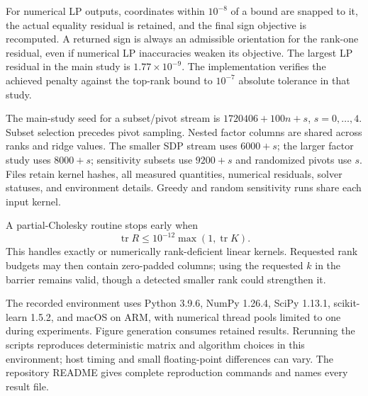 \documentclass[final,leqno,letterpaper]{etna}
\newcommand{\tr}{\operatorname{tr}}
\begin{document}
For numerical LP outputs, coordinates within $10^{-8}$ of a bound are snapped to it, the actual equality residual is retained, and the final sign objective is recomputed. A returned sign is always an admissible orientation for the rank-one residual, even if numerical LP inaccuracies weaken its objective. The largest LP residual in the main study is $1.77\times10^{-9}$. The implementation verifies the achieved penalty against the top-rank bound to $10^{-7}$ absolute tolerance in that study.

The main-study seed for a subset/pivot stream is $1720406+100n+s$, $s=0,\ldots,4$. Subset selection precedes pivot sampling. Nested factor columns are shared across ranks and ridge values. The smaller SDP stream uses $6000+s$; the larger factor study uses $8000+s$; sensitivity subsets use $9200+s$ and randomized pivots use $s$. Files retain kernel hashes, all measured quantities, numerical residuals, solver statuses, and environment details. Greedy and random sensitivity runs share each input kernel.

A partial-Cholesky routine stops early when
\[\tr R\le 10^{-12}\max(1,\tr K).\] This handles exactly or numerically rank-deficient linear kernels. Requested rank budgets may then contain zero-padded columns; using the requested $k$ in the barrier remains valid, though a detected smaller rank could strengthen it.

The recorded environment uses Python 3.9.6, NumPy 1.26.4, SciPy 1.13.1, scikit-learn 1.5.2, and macOS on ARM, with numerical thread pools limited to one during experiments. Figure generation consumes retained results. Rerunning the scripts reproduces deterministic matrix and algorithm choices in this environment; host timing and small floating-point differences can vary. The repository README gives complete reproduction commands and names every result file.
\end{document}
